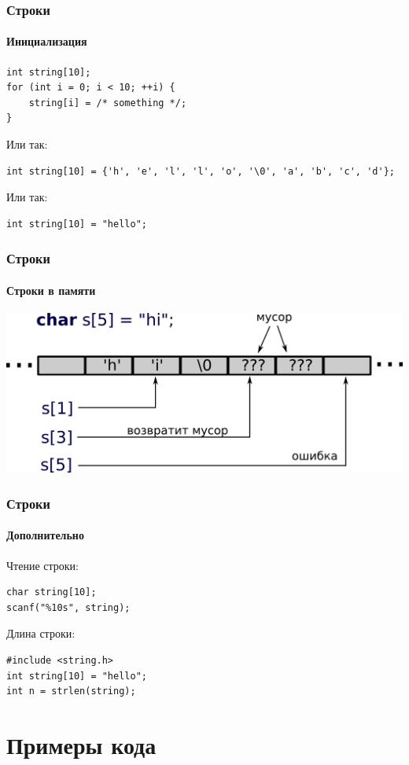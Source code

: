 \documentclass[12pt,pdf,hyperref={unicode}]{beamer}
\begin{document}
\begin{frame}[fragile]
\frametitle{Строки} 
\framesubtitle{Инициализация}
\begin{lstlisting}
int string[10];
for (int i = 0; i < 10; ++i) {
    string[i] = /* something */;
}
\end{lstlisting}
Или так:\\
\begin{lstlisting}
int string[10] = {'h', 'e', 'l', 'l', 'o', '\0', 'a', 'b', 'c', 'd'};
\end{lstlisting}
Или так:\\
\begin{lstlisting}
int string[10] = "hello";
\end{lstlisting}
\end{frame}

\begin{frame}[fragile]
\frametitle{Строки} 
\framesubtitle{Строки в памяти}
\begin{center}
\includegraphics[width=0.95\linewidth]{images/string_in_memory.png}
\end{center}
\end{frame}

\begin{frame}[fragile]
\frametitle{Строки} 
\framesubtitle{Дополнительно}
Чтение строки:
\begin{lstlisting}
char string[10];
scanf("%10s", string);
\end{lstlisting}
Длина строки:
\begin{lstlisting}
#include <string.h>
int string[10] = "hello";
int n = strlen(string);
\end{lstlisting}
\end{frame}

\section{Примеры кода}
\end{document}
